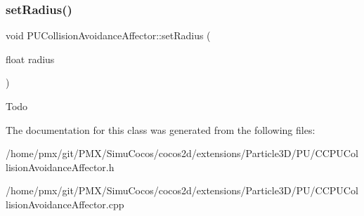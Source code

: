 \subsubsection{\texorpdfstring{set\+Radius()}{setRadius()}\hspace{0.1cm}{\footnotesize\ttfamily [2/2]}}
{\footnotesize\ttfamily void P\+U\+Collision\+Avoidance\+Affector\+::set\+Radius (\begin{DoxyParamCaption}\item[{float}]{radius }\end{DoxyParamCaption})}

Todo 

The documentation for this class was generated from the following files\+:\begin{DoxyCompactItemize}
\item 
/home/pmx/git/\+P\+M\+X/\+Simu\+Cocos/cocos2d/extensions/\+Particle3\+D/\+P\+U/C\+C\+P\+U\+Collision\+Avoidance\+Affector.\+h\item 
/home/pmx/git/\+P\+M\+X/\+Simu\+Cocos/cocos2d/extensions/\+Particle3\+D/\+P\+U/C\+C\+P\+U\+Collision\+Avoidance\+Affector.\+cpp\end{DoxyCompactItemize}
